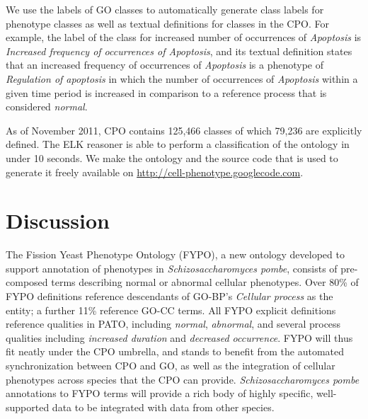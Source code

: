 \documentclass[11pt]{article}
\renewcommand{\cite}{\citep}
\begin{document}
We use the labels of GO classes to automatically generate class labels
for phenotype classes as well as textual definitions for classes in
the CPO. For example, the label of the class for increased number of
occurrences of {\em Apoptosis} is {\em Increased frequency of
  occurrences of Apoptosis}, and its textual definition states that an
increased frequency of occurrences of {\em Apoptosis} is a phenotype
of {\em Regulation of apoptosis} in which the number of occurrences of
{\em Apoptosis} within a given time period is increased in comparison
to a reference process that is considered {\em normal}.

As of November 2011, CPO contains 125,466 classes of which 79,236 are
explicitly defined.  The ELK reasoner \cite{Kazakov2011} is able to
perform a classification of the ontology in under 10 seconds. We make
the ontology and the source code that is used to generate it freely
available on \url{http://cell-phenotype.googlecode.com}.

\section{Discussion}
The Fission Yeast Phenotype Ontology (FYPO), a new ontology developed
to support annotation of phenotypes in {\em Schizosaccharomyces
  pombe}, consists of pre-composed terms describing normal or abnormal
cellular phenotypes. Over 80\% of FYPO definitions reference
descendants of GO-BP's {\em Cellular process} as the entity; a further
11\% reference GO-CC terms. All FYPO explicit definitions reference
qualities in PATO, including {\em normal}, {\em abnormal}, and several
process qualities including {\em increased duration} and {\em
  decreased occurrence}. FYPO will thus fit neatly under the CPO
umbrella, and stands to benefit from the automated synchronization
between CPO and GO, as well as the integration of cellular phenotypes
across species that the CPO can provide. {\em Schizosaccharomyces
  pombe} annotations to FYPO terms will provide a rich body of highly
specific, well-supported data to be integrated with data from other
species.
\end{document}
